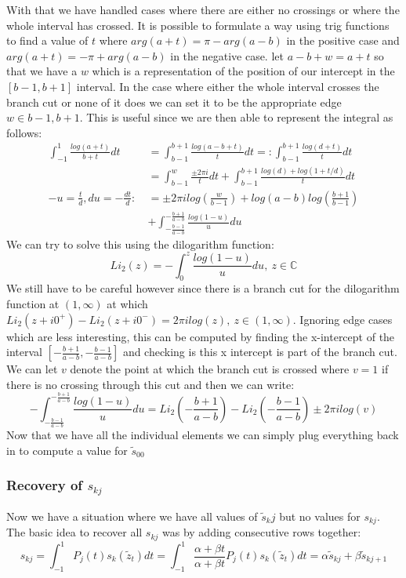 \documentclass{article}
\begin{document}
With that we have handled cases where there are either no crossings or where the whole interval has crossed.
It is possible to formulate a way using trig functions to find a value of $t$ where $arg(a+t)=\pi-arg(a-b)$ in the positive case and $arg(a+t)=-\pi+arg(a-b)$ in the negative case.
let $a-b+w=a+t$ so that we have a $w$ which is a representation of the position of our intercept in the $[b-1,b+1]$ interval.
In the case where either the whole interval crosses the branch cut or none of it does we can set it to be the appropriate edge $w\in{b-1,b+1}$. This is useful since we are then able to represent the integral as follows:
\begin{align}
    \int_{-1}^1\frac{log(a+t)}{b+t}dt&=\int_{b-1}^{b+1}\frac{log(a-b+t)}{t}dt=:\int_{b-1}^{b+1}\frac{log(d+t)}{t}dt\\
    &=\int_{b-1}^{w}\frac{\pm2\pi i}{t}dt+\int_{b-1}^{b+1}\frac{log(d)+log(1+t/d)}{t}dt\\
    -u=\frac{t}{d},du=-\frac{dt}{d}:\:&=\pm2\pi ilog(\frac{w}{b-1})+log(a-b)log(\frac{b+1}{b-1})\\
    &+\int_{-\frac{b-1}{a-b}}^{-\frac{b+1}{a-b}}\frac{log(1-u)}{u}du
\end{align}
We can try to solve this using the dilogarithm function:
$$Li_2(z) = -\int_0^z\frac{log(1-u)}{u}du,\:z\in\mathbb{C}$$
We still have to be careful however since there is a branch cut for the dilogarithm function at $(1,\infty)$ at which $Li_2(z+i0^+)-Li_2(z+i0^-) = 2\pi ilog(z),\:z\in(1,\infty)$.
Ignoring edge cases which are less interesting, this can be computed by finding the x-intercept of the interval $[-\frac{b+1}{a-b},-\frac{b-1}{a-b}]$ and checking is this x intercept is part of the branch cut.
We can let $v$ denote the point at which the branch cut is crossed where $v=1$ if there is no crossing through this cut and then we can write:
$$-\int_{-\frac{b-1}{a-b}}^{-\frac{b+1}{a-b}}\frac{log(1-u)}{u}du = Li_2(-\frac{b+1}{a-b})-Li_2(-\frac{b-1}{a-b})\pm2\pi ilog(v)$$
Now that we have all the individual elements we can simply plug everything back in to compute a value for $\tilde{s}_{00}$

\subsubsection{Recovery of $s_{kj}$}
Now we have a situation where we have all values of $\tilde{s}_kj$ but no values for $s_{kj}$.
The basic idea to recover all $s_{kj}$ was by adding consecutive rows together:
$$s_{kj}=\int_{-1}^1P_j(t)s_k(\tilde{z}_t)dt=\int_{-1}^1\frac{\alpha+\beta t}{\alpha+\beta t}P_j(t)s_k(\tilde{z}_t)dt=\alpha\tilde{s}_{kj}+\beta\tilde{s}_{kj+1}$$
\end{document}
